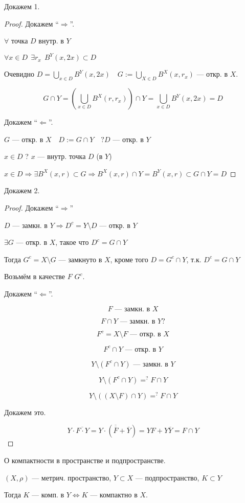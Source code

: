 \noindent
Докажем 1.
\begin{proof}
    Докажем ``$\Rightarrow$''.

    $\forall$ точка $D$ внутр. в $Y$

    $\forall x\in D \ \ \exists r_x \ \ B^Y(x,2x)\subset D$

    Очевидно $D=\bigcup\limits_{x\in D} B^Y(x,2x) \quad G:=\bigcup\limits_{X\in D} B^X(x,r_x)$ --- откр. в $X$.

    $$G\cap Y=(\bigcup\limits_{x\in D} B^X(r,r_x))\cap Y=\bigcup\limits_{x\in D}B^Y(x,2x)=D$$

    Докажем ``$\Leftarrow$''.

    $G$ --- откр. в $X\quad D:=G\cap Y \quad ?D$ --- откр. в $Y$ 

    $x\in D$ ? $x$ --- внутр. точка $D$ (в $Y$)

    $x\in D \Rightarrow \exists B^X(x,r)\subset G \Rightarrow B^X(x,r)\cap Y=B^Y(x,r)\subset G\cap Y=D$
\end{proof}

\noindent
Докажем 2.
\begin{proof}
    Докажем ``$\Rightarrow$''

    $D$ --- замкн. в $Y \Rightarrow D^c=Y\setminus D$ --- откр. в $Y$

    $\exists G$ --- откр. в $X$, такое что $D^c=G\cap Y$

    Тогда $G^c=X\setminus G$ --- замкнуто в $X$, кроме того $D=G^c\cap Y$, т.к. $D^c=G\cap Y$

    Возьмём в качестве $F$ $G^c$.

    Докажем ``$\Leftarrow$''.

    $$F\text{ --- замкн. в }X$$

    $$F\cap Y\text{ --- замкн. в }Y?$$

    $$F^c=X\setminus F\text{ --- откр. в }X$$

    $$F^c\cap Y\text{ --- откр. в }Y$$
    
    $$Y\setminus (F^c\cap Y) \text{ --- замкн. в }Y$$

    $$Y\setminus (F^c\cap Y) =^? F\cap Y$$

    $$Y\setminus ((X\setminus F)\cap Y) =^? F\cap Y$$

    Докажем это.

    $$Y\cdot\overline{F\cdot Y}=Y\cdot(\overline{\overline F}+\overline Y)=YF+Y\overline Y=F\cap Y$$
\end{proof}

\begin{theorem}
    О компактности в пространстве и подпространстве.

    $(X,\rho)$ --- метрич. пространство, $Y\subset X$ --- подпространство, $K\subset Y$

    Тогда $K$ --- комп. в $Y \Leftrightarrow K$ --- компактно в $X$.
\end{theorem}

